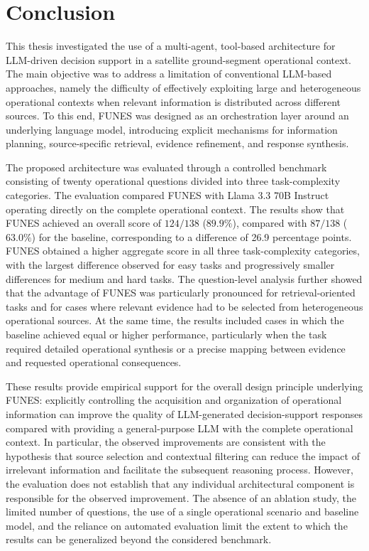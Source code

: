 \chapter{Conclusion}
\label{sec:conclusion}

This thesis investigated the use of a multi-agent, tool-based architecture for LLM-driven decision support in a satellite ground-segment operational context. The main objective was to address a limitation of conventional LLM-based approaches, namely the difficulty of effectively exploiting large and heterogeneous operational contexts when relevant information is distributed across different sources. To this end, FUNES was designed as an orchestration layer around an underlying language model, introducing explicit mechanisms for information planning, source-specific retrieval, evidence refinement, and response synthesis.

The proposed architecture was evaluated through a controlled benchmark consisting of twenty operational questions divided into three task-complexity categories. The evaluation compared FUNES with Llama 3.3 70B Instruct operating directly on the complete operational context. The results show that FUNES achieved an overall score of $124/138$ ($89.9\%$), compared with $87/138$ ($63.0\%$) for the baseline, corresponding to a difference of 26.9 percentage points. FUNES obtained a higher aggregate score in all three task-complexity categories, with the largest difference observed for easy tasks and progressively smaller differences for medium and hard tasks. The question-level analysis further showed that the advantage of FUNES was particularly pronounced for retrieval-oriented tasks and for cases where relevant evidence had to be selected from heterogeneous operational sources. At the same time, the results included cases in which the baseline achieved equal or higher performance, particularly when the task required detailed operational synthesis or a precise mapping between evidence and requested operational consequences.

These results provide empirical support for the overall design principle underlying FUNES: explicitly controlling the acquisition and organization of operational information can improve the quality of LLM-generated decision-support responses compared with providing a general-purpose LLM with the complete operational context. In particular, the observed improvements are consistent with the hypothesis that source selection and contextual filtering can reduce the impact of irrelevant information and facilitate the subsequent reasoning process. However, the evaluation does not establish that any individual architectural component is responsible for the observed improvement. The absence of an ablation study, the limited number of questions, the use of a single operational scenario and baseline model, and the reliance on automated evaluation limit the extent to which the results can be generalized beyond the considered benchmark.

